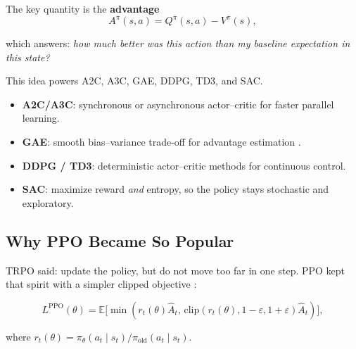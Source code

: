 \documentclass[11pt]{article}
\newcommand{\E}{\mathbb{E}}
\newcommand{\adv}{\hat{A}}
\begin{document}
  The key quantity is the \textbf{advantage}
  \[
  A^\pi(s,a) = Q^\pi(s,a) - V^\pi(s),
  \]

  which answers: \emph{how much better was this action than my baseline expectation in this state?}

  This idea powers A2C, A3C, GAE, DDPG, TD3, and SAC.

  \begin{itemize}
    \item \textbf{A2C/A3C}: synchronous or asynchronous actor--critic for faster parallel learning.
    \item \textbf{GAE}: smooth bias--variance trade-off for advantage estimation \cite{gae}.
    \item \textbf{DDPG / TD3}: deterministic actor--critic methods for continuous control.
    \item \textbf{SAC}: maximize reward \emph{and} entropy, so the policy stays stochastic and exploratory.
  \end{itemize}

  \subsection{Why PPO Became So Popular}

  TRPO said: update the policy, but do not move too far in one step. PPO kept that spirit with a simpler clipped objective \cite{ppo}:

  \[
  L^{\mathrm{PPO}}(\theta)=\E\bigl[\min(r_t(\theta)\adv_t,\, \mathrm{clip}(r_t(\theta),1-\varepsilon,1+\varepsilon)\adv_t)\bigr],
  \]

  where $r_t(\theta)=\pi_\theta(a_t\mid s_t)/\pi_{\mathrm{old}}(a_t\mid s_t)$.
\end{document}
